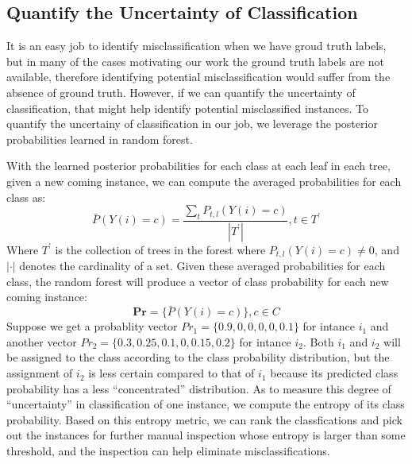 
\subsection{Quantify the Uncertainty of Classification}
It is an easy job to identify misclassification when we have groud truth labels, but in many of the cases motivating
our work the ground truth labels are not available, therefore identifying potential misclassification
would suffer from the absence of ground truth. However, if we can quantify the uncertainty of classification, that might help identify potential misclassified 
instances. To quantify the uncertainy of classification in our job, we leverage the posterior probabilities learned in random forest.

With the learned posterior probabilities for each class at each leaf in each tree, given a new coming instance, we can compute the averaged probabilities for each class as:
\begin{displaymath}
    \bar P(Y(i)=c) = \frac{\sum_{t} P_{t,l}(Y(i)=c)}{|T^{'}|}, t\in T^{'}
\end{displaymath}
Where $T^{'}$ is the collection of trees in the forest where $P_{t,l}(Y(i)=c)\neq 0$, and $|\cdot|$ denotes the cardinality of a set. Given these averaged 
probabilities for each class, the random forest will produce a vector of class probability for each new coming instance:
\begin{displaymath}
\textbf{Pr} = \{\bar P(Y(i)=c)\}, c\in C
\end{displaymath}
Suppose we get a probablity vector $Pr_{1} = \{0.9, 0, 0, 0, 0, 0.1\}$ for intance $i_{1}$ and another vector $Pr_{2} = \{0.3, 0.25, 0.1, 0, 0.15, 0.2\}$ for intance $i_{2}$. Both $i_{1}$ and $i_{2}$ will be assigned to the class according to the class probability distribution, but the assignment of $i_{2}$ is less certain compared to that of $i_{1}$ because its predicted class probability has a less ``concentrated'' distribution. As to measure this degree of ``uncertainty'' in classification of one instance, we compute the entropy of its class probability. Based on this entropy metric, we can rank the classfications and pick out the instances for further manual inspection whose entropy is larger than some threshold, and the inspection can help eliminate misclassifications.

